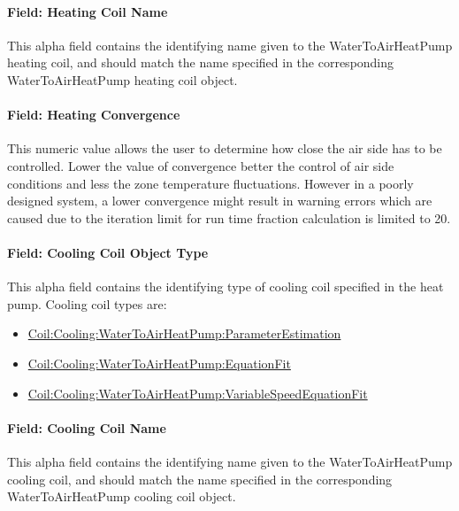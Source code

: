 \paragraph{Field: Heating Coil Name}\label{field-heating-coil-name-7}

This alpha field contains the identifying name given to the WaterToAirHeatPump heating coil, and should match the name specified in the corresponding WaterToAirHeatPump heating coil object.

\paragraph{Field: Heating Convergence}\label{field-heating-convergence}

This numeric value allows the user to determine how close the air side has to be controlled. Lower the value of convergence better the control of air side conditions and less the zone temperature fluctuations. However in a poorly designed system, a lower convergence might result in warning errors which are caused due to the iteration limit for run time fraction calculation is limited to 20.

\paragraph{Field: Cooling Coil Object Type}\label{field-cooling-coil-object-type-5}

This alpha field contains the identifying type of cooling coil specified in the heat pump. Cooling coil types are:

\begin{itemize}
\item
  \hyperref[coilcoolingwatertoairheatpumpparameterestimation]{Coil:Cooling:WaterToAirHeatPump:ParameterEstimation}
\item
  \hyperref[coilcoolingwatertoairheatpumpequationfit]{Coil:Cooling:WaterToAirHeatPump:EquationFit}
\item
  \hyperref[coilcoolingwatertoairheatpumpvariablespeedequationfit]{Coil:Cooling:WaterToAirHeat\hyperref[pumpvariablespeed]{Pump:VariableSpeed}EquationFit}
\end{itemize}

\paragraph{Field: Cooling Coil Name}\label{field-cooling-coil-name-5}

This alpha field contains the identifying name given to the WaterToAirHeatPump cooling coil, and should match the name specified in the corresponding WaterToAirHeatPump cooling coil object.

